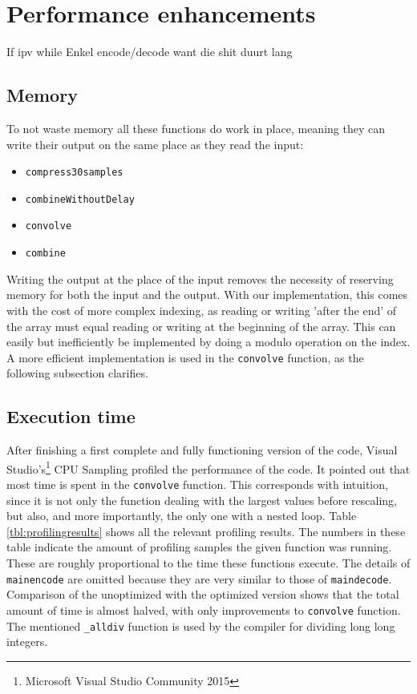 \documentclass[a4paper]{article}
\begin{document}
\section{Performance enhancements}\label{sec:performance}
If ipv while
Enkel encode/decode want die shit duurt lang
\subsection{Memory}
To not waste memory all these functions do work in place, meaning they can write their output on the same place as they read the input:
\begin{itemize}[noitemsep]
\item \texttt{compress30samples}
\item \texttt{combineWithoutDelay}
\item \texttt{convolve}
\item \texttt{combine}
\end{itemize}
Writing the output at the place of the input removes the necessity of reserving memory for both the input and the output. With our implementation, this comes with the cost of more complex indexing, as reading or writing 'after the end' of the array must equal reading or writing at the beginning of the array. This can easily but inefficiently be implemented by doing a modulo operation on the index. A more efficient implementation is used in the \texttt{convolve} function, as the following subsection clarifies.
\subsection{Execution time}\label{sec:processing}
After finishing a first complete and fully functioning version of the code, Visual Studio's\footnote{Microsoft Visual Studio Community 2015} CPU Sampling profiled the performance of the code. It pointed out that most time is spent in the \texttt{convolve} function. This corresponds with intuition, since it is not only the function dealing with the largest values before rescaling, but also, and more importantly, the only one with a nested loop. Table \ref{tbl:profilingresults} shows all the relevant profiling results. The numbers in these table indicate the amount of profiling samples the given function was running. These are roughly proportional to the time these functions execute. The details of \texttt{mainencode} are omitted because they are very similar to those of \texttt{maindecode}. Comparison of the unoptimized with the optimized version shows that the total amount of time is almost halved, with only improvements to \texttt{convolve} function. The mentioned \texttt{\_alldiv} function is used by the compiler for dividing long long integers.\\
\end{document}
